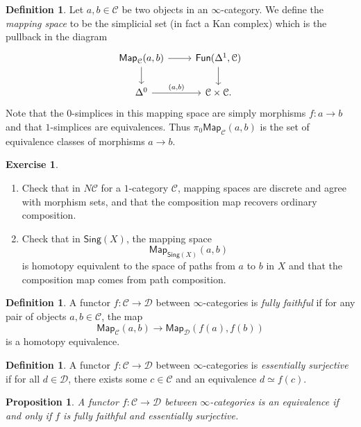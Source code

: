 \documentclass[10pt]{amsart}
\newtheorem{prop}[thm]{Proposition}
\theoremstyle{definition}
\newtheorem{defn}[thm]{Definition}
\newtheorem{exer}[thm]{Exercise}
\theoremstyle{remark}
\theoremstyle{plain}
\theoremstyle{definition}
\theoremstyle{remark}
\newcommand{\mc}[1]{\mathcal{#1}}
\newcommand{\ms}[1]{\mathsf{#1}}
\newcommand{\1}{\mathbf{1}}
\newcommand{\2}{\mathbf{2}}
\newcommand{\3}{\mathbf{3}}
\begin{document}
\begin{defn}
    Let $a,b \in \mc{C}$ be two objects in an $\infty$-category. We define the \textit{mapping space} to be the simplicial set (in fact a Kan complex) which is the pullback in the diagram
    \begin{equation*}
    \begin{tikzcd}
        \ms{Map}_{\mc{C}}(a,b) \ar{r} \ar{d} & \ms{Fun}(\Delta^1, \mc{C}) \ar{d} \\
        \Delta^0 \ar{r}{(a,b)} & \mc{C} \times \mc{C}.
    \end{tikzcd}
    \end{equation*}
    Note that the $0$-simplices in this mapping space are simply morphisms $f \colon a \to b$ and that $1$-simplices are equivalences. Thus $\pi_0 \ms{Map}_{\mc{C}}(a,b)$ is the set of equivalence classes of morphisms $a \to b$.
\end{defn}

\begin{exer}\leavevmode
    \begin{enumerate}
        \item Check that in $N\mc{C}$ for a $1$-category $\mc{C}$, mapping spaces are discrete and agree with morphism sets, and that the composition map recovers ordinary composition.
        \item Check that in $\ms{Sing}(X)$, the mapping space
        \[ \ms{Map}_{\ms{Sing}(X)}(a,b) \]
        is homotopy equivalent to the space of paths from $a$ to $b$ in $X$ and that the composition map comes from path composition.
    \end{enumerate}
\end{exer}

\begin{defn}
    A functor $f \colon \mc{C} \to \mc{D}$ between $\infty$-categories is \textit{fully faithful} if for any pair of objects $a,b \in \mc{C}$, the map
    \[ \ms{Map}_{\mc{C}}(a,b) \to \ms{Map}_{\mc{D}}(f(a), f(b)) \]
    is a homotopy equivalence.
\end{defn}

\begin{defn}
    A functor $f \colon \mc{C} \to \mc{D}$ between $\infty$-categories is \textit{essentially surjective} if for all $d \in \mc{D}$, there exists some $c \in \mc{C}$ and an equivalence $d \simeq f(c)$.
\end{defn}

\begin{prop}
    A functor $f \colon \mc{C} \to \mc{D}$ between $\infty$-categories is an equivalence if and only if $f$ is fully faithful and essentially surjective.
\end{prop}
\end{document}
